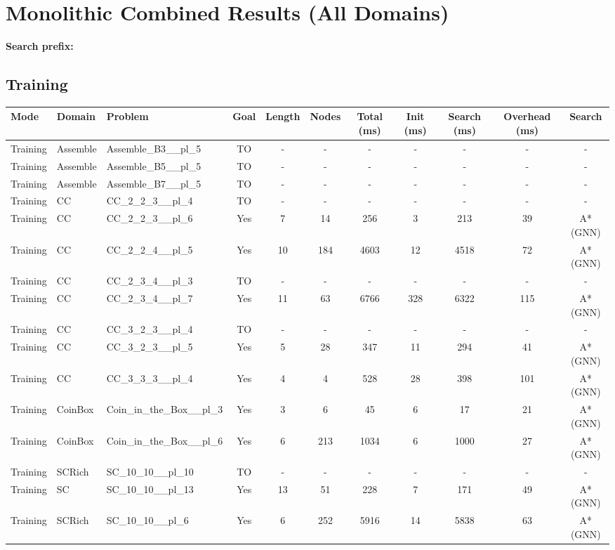 \documentclass{article}
\begin{document}
\section*{Monolithic Combined Results (All Domains)}
\textbf{Search prefix:} 
\\[0.5cm]
\subsection*{Training}
\begin{tabular}{lllcccccccc}
\toprule
Mode & Domain & Problem & Goal & Length & Nodes & Total (ms) & Init (ms) & Search (ms) & Overhead (ms) & Search \\
\midrule
Training & Assemble & Assemble\_B3\_\_pl\_5 & TO & - & - & - & - & - & - & - \\
Training & Assemble & Assemble\_B5\_\_pl\_5 & TO & - & - & - & - & - & - & - \\
Training & Assemble & Assemble\_B7\_\_pl\_5 & TO & - & - & - & - & - & - & - \\
Training & CC & CC\_2\_2\_3\_\_pl\_4 & TO & - & - & - & - & - & - & - \\
Training & CC & CC\_2\_2\_3\_\_pl\_6 & Yes & 7 & 14 & 256 & 3 & 213 & 39 & A*(GNN) \\
Training & CC & CC\_2\_2\_4\_\_pl\_5 & Yes & 10 & 184 & 4603 & 12 & 4518 & 72 & A*(GNN) \\
Training & CC & CC\_2\_3\_4\_\_pl\_3 & TO & - & - & - & - & - & - & - \\
Training & CC & CC\_2\_3\_4\_\_pl\_7 & Yes & 11 & 63 & 6766 & 328 & 6322 & 115 & A*(GNN) \\
Training & CC & CC\_3\_2\_3\_\_pl\_4 & TO & - & - & - & - & - & - & - \\
Training & CC & CC\_3\_2\_3\_\_pl\_5 & Yes & 5 & 28 & 347 & 11 & 294 & 41 & A*(GNN) \\
Training & CC & CC\_3\_3\_3\_\_pl\_4 & Yes & 4 & 4 & 528 & 28 & 398 & 101 & A*(GNN) \\
Training & CoinBox & Coin\_in\_the\_Box\_\_pl\_3 & Yes & 3 & 6 & 45 & 6 & 17 & 21 & A*(GNN) \\
Training & CoinBox & Coin\_in\_the\_Box\_\_pl\_6 & Yes & 6 & 213 & 1034 & 6 & 1000 & 27 & A*(GNN) \\
Training & SCRich & SC\_10\_10\_\_pl\_10 & TO & - & - & - & - & - & - & - \\
Training & SC & SC\_10\_10\_\_pl\_13 & Yes & 13 & 51 & 228 & 7 & 171 & 49 & A*(GNN) \\
Training & SCRich & SC\_10\_10\_\_pl\_6 & Yes & 6 & 252 & 5916 & 14 & 5838 & 63 & A*(GNN) \\

\end{tabular}
\end{document}
